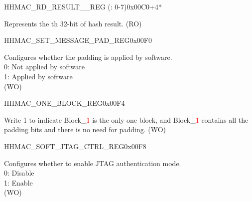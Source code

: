 \begin{register}{H}{HMAC\_RD\_RESULT\_\_REG (: 0-7)}{0x00C0+4*}\label{regdesc:HMACRDRESULTNREG}
%
\regnewline%
\begin{regdesc}\begin{reglist}
\label{fielddesc:HMACRDATAN}\item [HMAC\_RDATA\_\regindex{n}] Represents the th 32-bit of hash result. (RO)
\end{reglist}\end{regdesc}
\end{register}


\begin{register}{H}{HMAC\_SET\_MESSAGE\_PAD\_REG}{0x00F0}\label{regdesc:HMACSETMESSAGEPADREG}
%
%
\regnewline%
\begin{regdesc}\begin{reglist}
\label{fielddesc:HMACSETTEXTPAD}\item [HMAC\_SET\_TEXT\_PAD] Configures whether the padding is applied by software.
\\0: Not applied by software
\\1: Applied by software
\\(WO)
\end{reglist}\end{regdesc}
\end{register}

\begin{register}{H}{HMAC\_ONE\_BLOCK\_REG}{0x00F4}\label{regdesc:HMACONEBLOCKREG}
%
%
\regnewline%
\begin{regdesc}\begin{reglist}
\label{fielddesc:HMACSETONEBLOCK}\item [HMAC\_SET\_ONE\_BLOCK] Write 1 to indicate Block\_\textcolor{red}{1} is the only one block, and Block\_\textcolor{red}{1} contains all the padding bits and there is no need for padding. (WO)
\end{reglist}\end{regdesc}
\end{register}


\begin{register}{H}{HMAC\_SOFT\_JTAG\_CTRL\_REG}{0x00F8}\label{regdesc:HMACSOFTJTAGCTRLREG}
%
%
\regnewline%
\begin{regdesc}\begin{reglist}
\label{fielddesc:HMACSOFTJTAGCTRL}\item [HMAC\_SOFT\_JTAG\_CTRL] Configures whether to enable JTAG authentication mode.
\\0: Disable
\\1: Enable
\\(WO)
\end{reglist}\end{regdesc}
\end{register}



